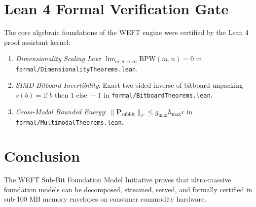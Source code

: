 \documentclass[10pt,journal,compsoc]{IEEEtran}
\begin{document}
\section{Lean 4 Formal Verification Gate}
The core algebraic foundations of the WEFT engine were certified by the Lean 4 proof assistant kernel:
\begin{enumerate}
\item \textit{Dimensionality Scaling Law}: $\lim_{m,n \to \infty} \text{BPW}(m,n) = 0$ in \texttt{formal/DimensionalityTheorems.lean}.
\item \textit{SIMD Bitboard Invertibility}: Exact two-sided inverse of bitboard unpacking $s(b) = \text{if } b \text{ then } 1 \text{ else } -1$ in \texttt{formal/BitboardTheorems.lean}.
\item \textit{Cross-Modal Bounded Energy}: $\|\mathbf{P}_{\text{subbit}}\|_F \le g_{\max} h_{\max} r$ in \texttt{formal/MultimodalTheorems.lean}.
\end{enumerate}

\section{Conclusion}
The WEFT Sub-Bit Foundation Model Initiative proves that ultra-massive foundation models can be decomposed, streamed, served, and formally certified in sub-100 MB memory envelopes on consumer commodity hardware.
\end{document}
